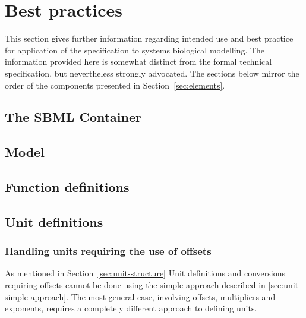 
\section{Best practices}
\label{sec:best-practices}

This section gives further information regarding intended use and
best practice for application of the specification to systems
biological modelling. The information provided here is somewhat
distinct from the formal technical specification, but nevertheless
strongly advocated.  The sections below mirror the order of the
components presented in Section~\ref{sec:elements}.


\subsection{The SBML Container}
\label{sec:bp:sbml}


\subsection{Model}
\label{sec:bp:model}


\subsection{Function definitions}
\label{sec:bp:functions}

\subsection{Unit definitions}
\label{sec:bp:unitdefinitions}


\subsubsection{Handling units requiring the use of offsets}
\label{sec:bp:unitdefinitions:offset}

As mentioned in Section~\ref{sec:unit-structure} Unit definitions and conversions 
requiring offsets cannot be done using the simple approach described in \ref{sec:unit-simple-approach}.  
The most general case, involving offsets, multipliers and exponents, requires a completely
different approach to defining units.

